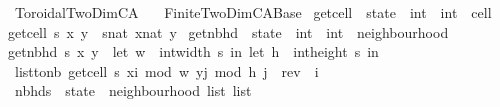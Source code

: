 %
\begin{isabellebody}%
%
%
\isadelimdocument
%
\endisadelimdocument
%
\isatagdocument
%
\isamarkuptrue%
%
\endisatagdocument
{\isafolddocument}%
%
\isadelimdocument
%
\endisadelimdocument
%
\isadelimtheory
%
\endisadelimtheory
%
\isatagtheory
{}\isamarkupfalse%
\ Toroidal{\isacharunderscore}TwoDim{\isacharunderscore}CA\isanewline
\ \ \ Finite{\isacharunderscore}TwoDim{\isacharunderscore}CA{\isacharunderscore}Base\isanewline
{}%
\endisatagtheory
{\isafoldtheory}%
%
\isadelimtheory
\isanewline
%
\endisadelimtheory
\isanewline
{}\isamarkupfalse%
\ get{\isacharunderscore}cell\ {\isacharcolon}{\isacharcolon}\ {\isachardoublequoteopen}state\ {\isasymRightarrow}\ int\ {\isasymRightarrow}\ int\ {\isasymRightarrow}\ cell{\isachardoublequoteclose}\ \isanewline
{\isachardoublequoteopen}get{\isacharunderscore}cell\ s\ x\ y\ {\isacharequal}\ s{\isacharbang}{\isacharparenleft}nat\ x{\isacharparenright}{\isacharbang}{\isacharparenleft}nat\ y{\isacharparenright}{\isachardoublequoteclose}\isanewline
\isanewline
{}\isamarkupfalse%
\ get{\isacharunderscore}nbhd\ {\isacharcolon}{\isacharcolon}\ {\isachardoublequoteopen}state\ {\isasymRightarrow}\ int\ {\isasymRightarrow}\ int\ {\isasymRightarrow}\ neighbourhood{\isachardoublequoteclose}\ \isanewline
{\isachardoublequoteopen}get{\isacharunderscore}nbhd\ s\ x\ y\ {\isacharequal}\ {\isacharparenleft}let\ w\ {\isacharequal}\ int{\isacharunderscore}width\ s\ in\ {\isacharparenleft}let\ h\ {\isacharequal}\ int{\isacharunderscore}height\ s\ in\isanewline
\ list{\isacharunderscore}to{\isacharunderscore}nb\ {\isacharbrackleft}get{\isacharunderscore}cell\ s\ {\isacharparenleft}{\isacharparenleft}x{\isacharplus}i{\isacharparenright}\ mod\ w{\isacharparenright}\ {\isacharparenleft}{\isacharparenleft}y{\isacharplus}j{\isacharparenright}\ mod\ h{\isacharparenright}{\isachardot}\ j\ {\isasymleftarrow}\ rev\ {\isacharbrackleft}{\isacharminus}{}{\isachardot}{\isachardot}{}{\isacharbrackright}{\isacharcomma}\ i\ {\isasymleftarrow}\ {\isacharbrackleft}{\isacharminus}{}{\isachardot}{\isachardot}{}{\isacharbrackright}{\isacharbrackright}{\isacharparenright}{\isacharparenright}{\isachardoublequoteclose}\isanewline
\isanewline
{}\isamarkupfalse%
\ nbhds\ {\isacharcolon}{\isacharcolon}\ {\isachardoublequoteopen}state\ {\isasymRightarrow}\ neighbourhood\ list\ list{\isachardoublequoteclose}\ \isanewline

\end{isabellebody}

